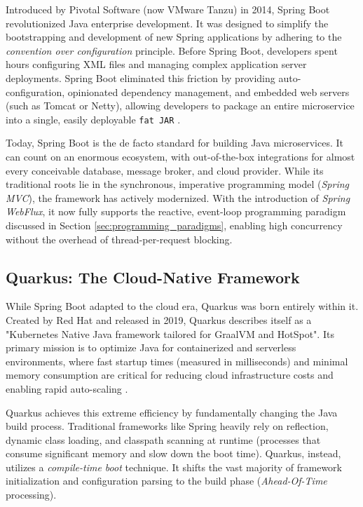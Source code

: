 Introduced by Pivotal Software (now VMware Tanzu) in 2014, Spring Boot revolutionized Java enterprise development. It was designed to simplify the bootstrapping and development of new Spring applications by adhering to the \textit{convention over configuration} principle. Before Spring Boot, developers spent hours configuring XML files and managing complex application server deployments. Spring Boot eliminated this friction by providing auto-configuration, opinionated dependency management, and embedded web servers (such as Tomcat or Netty), allowing developers to package an entire microservice into a single, easily deployable \texttt{fat JAR} \cite{spring_microservices_official}.

Today, Spring Boot is the de facto standard for building Java microservices. It can count on an enormous ecosystem, with out-of-the-box integrations for almost every conceivable database, message broker, and cloud provider. While its traditional roots lie in the synchronous, imperative programming model (\textit{Spring MVC}), the framework has actively modernized. With the introduction of \textit{Spring WebFlux}, it now fully supports the reactive, event-loop programming paradigm discussed in Section \ref{sec:programming_paradigms}, enabling high concurrency without the overhead of thread-per-request blocking.

\subsection{Quarkus: The Cloud-Native Framework}

While Spring Boot adapted to the cloud era, Quarkus was born entirely within it. Created by Red Hat and released in 2019, Quarkus describes itself as a "Kubernetes Native Java framework tailored for GraalVM and HotSpot". Its primary mission is to optimize Java for containerized and serverless environments, where fast startup times (measured in milliseconds) and minimal memory consumption are critical for reducing cloud infrastructure costs and enabling rapid auto-scaling \cite{redhat_quarkus_kubernetes}.

Quarkus achieves this extreme efficiency by fundamentally changing the Java build process. Traditional frameworks like Spring heavily rely on reflection, dynamic class loading, and classpath scanning at runtime (processes that consume significant memory and slow down the boot time). Quarkus, instead, utilizes a \textit{compile-time boot} technique. It shifts the vast majority of framework initialization and configuration parsing to the build phase (\textit{Ahead-Of-Time} processing). 

